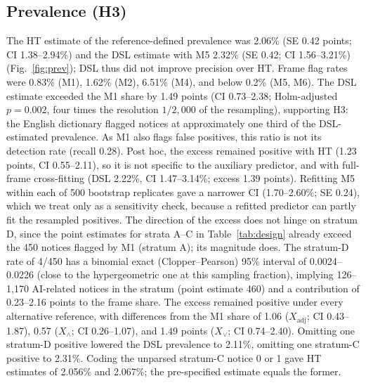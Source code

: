 \documentclass[runningheads]{llncs}
\begin{document}
\subsection{Prevalence (H3)}
The HT estimate of the reference-defined prevalence was 2.06\% (SE 0.42 points; CI 1.38--2.94\%) and the DSL estimate with M5 2.32\% (SE 0.42; CI 1.56--3.21\%) (Fig.~\ref{fig:prev}); DSL thus did not improve precision over HT. Frame flag rates were 0.83\% (M1), 1.62\% (M2), 6.51\% (M4), and below 0.2\% (M5, M6). The DSL estimate exceeded the M1 share by 1.49 points (CI 0.73--2.38; Holm-adjusted $p=0.002$, four times the resolution $1/2{,}000$ of the resampling), supporting H3: the English dictionary flagged notices at approximately one third of the DSL-estimated prevalence. As M1 also flags false positives, this ratio is not its detection rate (recall 0.28). Post hoc, the excess remained positive with HT (1.23 points, CI 0.55--2.11), so it is not specific to the auxiliary predictor, and with full-frame cross-fitting (DSL 2.22\%, CI 1.47--3.14\%; excess 1.39 points). Refitting M5 within each of 500 bootstrap replicates gave a narrower CI (1.70--2.60\%; SE 0.24), which we treat only as a sensitivity check, because a refitted predictor can partly fit the resampled positives. The direction of the excess does not hinge on stratum D, since the point estimates for strata A--C in Table~\ref{tab:design} already exceed the 450 notices flagged by M1 (stratum A); its magnitude does. The stratum-D rate of 4/450 has a binomial exact (Clopper--Pearson) 95\% interval of 0.0024--0.0226 (close to the hypergeometric one at this sampling fraction), implying 126--1,170 AI-related notices in the stratum (point estimate 460) and a contribution of 0.23--2.16 points to the frame share. The excess remained positive under every alternative reference, with differences from the M1 share of 1.06 ($X_{\mathrm{adj}}$; CI 0.43--1.87), 0.57 ($X_\wedge$; CI 0.26--1.07), and 1.49 points ($X_\vee$; CI 0.74--2.40). Omitting one stratum-D positive lowered the DSL prevalence to 2.11\%, omitting one stratum-C positive to 2.31\%. Coding the unparsed stratum-C notice 0 or 1 gave HT estimates of 2.056\% and 2.067\%; the pre-specified estimate equals the former.
\end{document}
